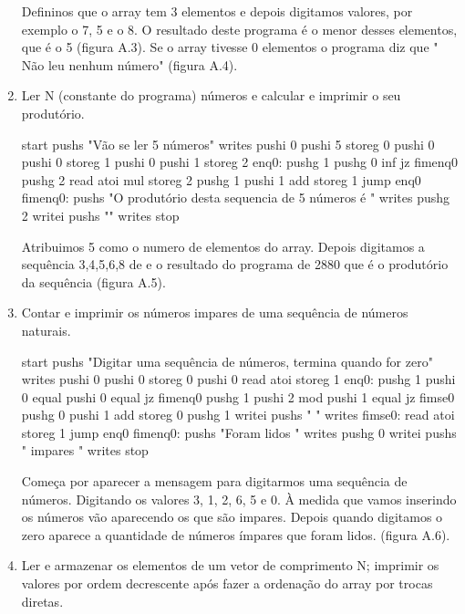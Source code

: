 \documentclass{report}
\begin{document}
\begin{enumerate}
	\indent
	Defininos que o array tem 3 elementos e depois digitamos valores, por exemplo o 7, 5 e o 8. O resultado deste programa é o menor desses elementos, que é o 5 (figura A.3). Se o array tivesse 0 elementos o programa diz que " 
	Não leu nenhum número" (figura A.4).
	
	\item Ler N (constante do programa) números e calcular e imprimir o seu produtório.
	
	\begin{code}
		start
		pushs "Vão se ler 5 números\n"
		writes
		pushi 0
		pushi 5
		storeg 0
		pushi 0
		pushi 0
		storeg 1
		pushi 0
		pushi 1
		storeg 2
		enq0:
		pushg 1
		pushg 0
		inf
		jz fimenq0
		pushg 2
		read
		atoi
		mul
		storeg 2
		pushg 1
		pushi 1
		add
		storeg 1
		jump enq0
		fimenq0:
		pushs "O produtório desta sequencia de 5 números é "
		writes
		pushg 2
		writei
		pushs "\n"
		writes
		stop
		
	\end{code}

	\indent
	Atribuimos 5 como o numero de elementos do array. Depois digitamos a sequência 3,4,5,6,8 de e o resultado do programa de 2880 que é o produtório da sequência (figura A.5).	
	
	\item Contar e imprimir os números impares de uma sequência de números naturais.
	
	\begin{code}
		start
		pushs "Digitar uma sequência de números, termina quando for zero\n"
		writes
		pushi 0
		pushi 0
		storeg 0
		pushi 0
		read
		atoi
		storeg 1
		enq0:
		pushg 1
		pushi 0
		equal
		pushi 0
		equal
		jz fimenq0
		pushg 1
		pushi 2
		mod
		pushi 1
		equal
		jz fimse0
		pushg 0
		pushi 1
		add
		storeg 0
		pushg 1
		writei
		pushs " \n"
		writes
		fimse0:
		read
		atoi
		storeg 1
		jump enq0
		fimenq0:
		pushs "Foram lidos "
		writes
		pushg 0
		writei
		pushs " impares \n"
		writes
		stop
		
	\end{code}
	
	\indent
	Começa por aparecer a mensagem para digitarmos uma sequência de números. 
	Digitando os valores 3, 1, 2, 6, 5 e 0. À medida que vamos inserindo os números vão aparecendo os que são impares. Depois quando digitamos o zero aparece a quantidade de números ímpares que foram lidos. (figura A.6).
	
	\item Ler e armazenar os elementos de um vetor de comprimento N; imprimir os valores por ordem decrescente após
	fazer a ordenação do array por trocas diretas.\\
	

\end{enumerate}
\end{document}
